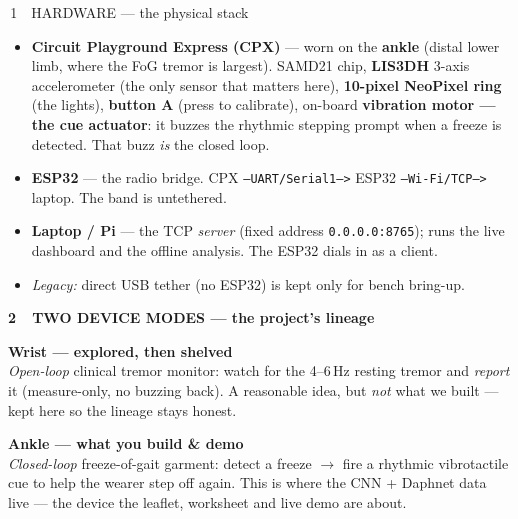 \documentclass[11pt]{article}
\newcommand{\code}[1]{{\footnotesize\color{muted}\texttt{#1}}}
\begin{document}
\vspace{7pt}

\begin{cat}{\,1\ \ HARDWARE — the physical stack}
  \begin{itemize}
    \item \textbf{Circuit Playground Express (CPX)} — worn on the \textbf{ankle}
      (distal lower limb, where the FoG tremor is largest). SAMD21 chip,
      \textbf{LIS3DH} 3-axis accelerometer (the only sensor that matters here),
      \textbf{10-pixel NeoPixel ring} (the lights), \textbf{button A} (press to calibrate),
      on-board \textbf{vibration motor — the cue actuator}: it buzzes the rhythmic
      stepping prompt when a freeze is detected. That buzz \emph{is} the closed loop.
    \item \textbf{ESP32} — the radio bridge. CPX \code{--UART/Serial1-->} ESP32
      \code{--Wi-Fi/TCP-->} laptop. The band is untethered.
    \item \textbf{Laptop / Pi} — the TCP \emph{server} (fixed address \code{0.0.0.0:8765});
      runs the live dashboard and the offline analysis. The ESP32 dials in as a client.
    \item {\color{legacy}\textit{Legacy:}} direct USB tether (no ESP32) is kept only for bench bring-up.
  \end{itemize}
\end{cat}

\vspace{6pt}

{\large\bfseries 2\ \ TWO DEVICE MODES — the project's lineage}\\[5pt]
\begin{minipage}[t]{0.49\textwidth}
  \begin{tcolorbox}[enhanced, equal height group=modes, colback=white, colframe=legacy,
    boxrule=0.9pt, arc=3pt, left=9pt, right=9pt, top=6pt, bottom=6pt]
    {\bfseries\color{legacy}Wrist — explored, then shelved}\\[3pt]
    \emph{Open-loop} clinical tremor monitor: watch for the 4–6\,Hz resting tremor
    and \emph{report} it (measure-only, no buzzing back). A reasonable idea, but
    \emph{not} what we built — kept here so the lineage stays honest.
  \end{tcolorbox}
\end{minipage}\hfill
\begin{minipage}[t]{0.49\textwidth}
  \begin{tcolorbox}[enhanced, equal height group=modes, colback=tealbg, colframe=teal,
    boxrule=0.9pt, arc=3pt, left=9pt, right=9pt, top=6pt, bottom=6pt]
    {\bfseries\color{teal}Ankle — what you build \& demo}\\[3pt]
    \emph{Closed-loop} freeze-of-gait garment: detect a freeze $\rightarrow$ fire a
    rhythmic vibrotactile cue to help the wearer step off again. This is where the
    CNN + Daphnet data live — the device the leaflet, worksheet and live demo are about.
  \end{tcolorbox}
\end{minipage}
\end{document}
